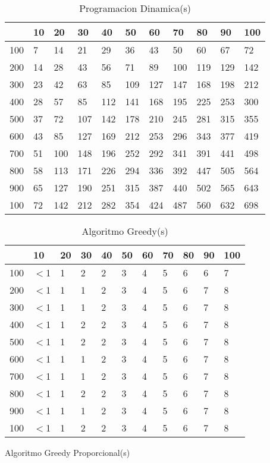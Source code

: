 \documentclass{article}
\begin{document}
\begin{center}
\begin{table}
\centering
\caption{Programacion Dinamica(\textmu s)}
\begin{tabularx}{0.8\textwidth}{|X|X|X|X|X|X|X|X|X|X|X|}
\hline &10&20&30&40&50&60&70&80&90&100\\
\hline 100&7&14&21&29&36&43&50&60&67&72\\
\hline 200&14&28&43&56&71&89&100&119&129&142\\
\hline 300&23&42&63&85&109&127&147&168&198&212\\
\hline 400&28&57&85&112&141&168&195&225&253&300\\
\hline 500&37&72&107&142&178&210&245&281&315&355\\
\hline 600&43&85&127&169&212&253&296&343&377&419\\
\hline 700&51&100&148&196&252&292&341&391&441&498\\
\hline 800&58&113&171&226&294&336&392&447&505&564\\
\hline 900&65&127&190&251&315&387&440&502&565&643\\
\hline 100&72&142&212&282&354&424&487&560&632&698\\
\hline
\end{tabularx}
\end{table}
\begin{table}
\centering
\caption{Algoritmo Greedy(\textmu s)}
\begin{tabularx}{0.8\textwidth}{|X|X|X|X|X|X|X|X|X|X|X|}
\hline &10&20&30&40&50&60&70&80&90&100\\
\hline 100&$<$1&1&2&2&3&4&5&6&6&7\\
\hline 200&$<$1&1&1&2&3&4&5&6&7&8\\
\hline 300&$<$1&1&1&2&3&4&5&6&7&8\\
\hline 400&$<$1&1&2&2&3&4&5&6&7&8\\
\hline 500&$<$1&1&2&2&3&4&5&6&7&8\\
\hline 600&$<$1&1&1&2&3&4&5&6&7&8\\
\hline 700&$<$1&1&1&2&3&4&5&6&7&8\\
\hline 800&$<$1&1&2&2&3&4&5&6&7&8\\
\hline 900&$<$1&1&1&2&3&4&5&6&7&8\\
\hline 100&$<$1&1&2&2&3&4&5&6&7&8\\
\hline
\end{tabularx}
\end{table}
\begin{table}
\centering
\caption{Algoritmo Greedy Proporcional(\textmu s)}

\end{table}
\end{center}
\end{document}
